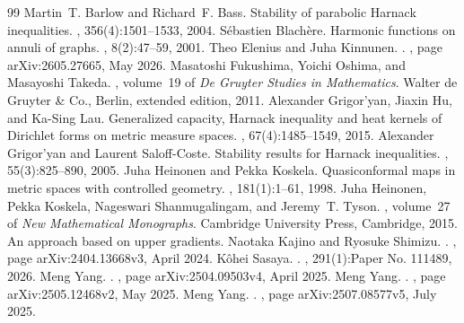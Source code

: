 \documentclass[10pt,a4paper]{amsart}
\numberwithin{equation}{section}
\begin{document}
\begin{thebibliography}{99}
 Martin~T. Barlow and Richard~F. Bass. \newblock Stability of parabolic {H}arnack inequalities. , 356(4):1501--1533, 2004.
 S\'ebastien Blach\`ere. \newblock Harmonic functions on annuli of graphs. , 8(2):47--59, 2001.
 Theo {Elenius} and Juha {Kinnunen}. . , page arXiv:2605.27665, May 2026.
 Masatoshi Fukushima, Yoichi Oshima, and Masayoshi Takeda. , volume~19 of {\em De Gruyter Studies in Mathematics}. \newblock Walter de Gruyter \& Co., Berlin, extended edition, 2011.
 Alexander Grigor'yan, Jiaxin Hu, and Ka-Sing Lau. \newblock Generalized capacity, {H}arnack inequality and heat kernels of {D}irichlet forms on metric measure spaces. , 67(4):1485--1549, 2015.
 Alexander Grigor'yan and Laurent Saloff-Coste. \newblock Stability results for {H}arnack inequalities. , 55(3):825--890, 2005.
 Juha Heinonen and Pekka Koskela. \newblock Quasiconformal maps in metric spaces with controlled geometry. , 181(1):1--61, 1998.
 Juha Heinonen, Pekka Koskela, Nageswari Shanmugalingam, and Jeremy~T. Tyson. , volume~27 of {\em New Mathematical Monographs}. \newblock Cambridge University Press, Cambridge, 2015. \newblock An approach based on upper gradients.
 Naotaka {Kajino} and Ryosuke {Shimizu}. . , page arXiv:2404.13668v3, April 2024.
 K{\^o}hei {Sasaya}. . , 291(1):Paper No. 111489, 2026.
 Meng {Yang}. . , page arXiv:2504.09503v4, April 2025.
 Meng {Yang}. . , page arXiv:2505.12468v2, May 2025.
 Meng {Yang}. . , page arXiv:2507.08577v5, July 2025.
\end{thebibliography}
\end{document}
